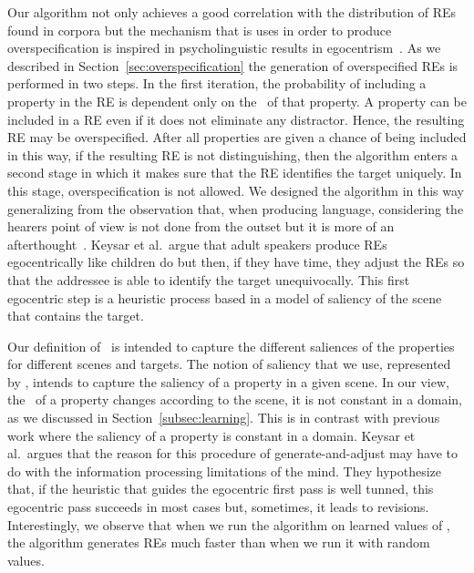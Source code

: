Our algorithm not only achieves a good correlation with the distribution of REs found in corpora but the mechanism that is uses in order to produce overspecification is inspired in psycholinguistic results in egocentrism~\cite{keysar:Curr98}. As we described in Section~\ref{sec:overspecification} the generation of overspecified REs is performed in two steps. In the first iteration, the probability of including a property in the RE is dependent only on the \puse\ of that property. A property can be included in a RE even if it does not eliminate any distractor. Hence, the resulting RE may be overspecified. After all properties are given a chance of being included in this way, if the resulting RE is not distinguishing, then the algorithm enters a second stage in which it makes sure that the RE identifies the target uniquely. In this stage, overspecification is not allowed. We designed the algorithm in this way generalizing from the observation that, when producing language, considering the hearers point of view is not done from the outset but it is more of an afterthought~\cite{keysar:Curr98}. Keysar et al.~argue that adult speakers produce REs egocentrically like children do but then, if they have time, they adjust the REs so that the addressee is able to identify the target unequivocally. This first egocentric step is a heuristic process based in a model of saliency of the scene that contains the target. 

Our definition of \puse\ is intended to capture the different saliences of the properties for different scenes and targets. The notion of saliency that we use, represented by \puse, intends to capture the saliency of a property in a given scene. In our view, the \puse\ of a property changes according to the scene, it is not constant in a domain, as we discussed in Section~\ref{subsec:learning}. This is in contrast with previous work where the saliency of a property is constant in a domain. Keysar et al.~argues that the reason for this procedure of generate-and-adjust may have to do with the information processing limitations of the mind. They hypothesize that, if the heuristic that guides the egocentric first pass is well tunned, this egocentric pass succeeds in most cases but, sometimes, it leads to revisions. Interestingly, we observe that when we run the algorithm on learned values of \puse, the algorithm generates REs much faster than when we run it with random values. 


